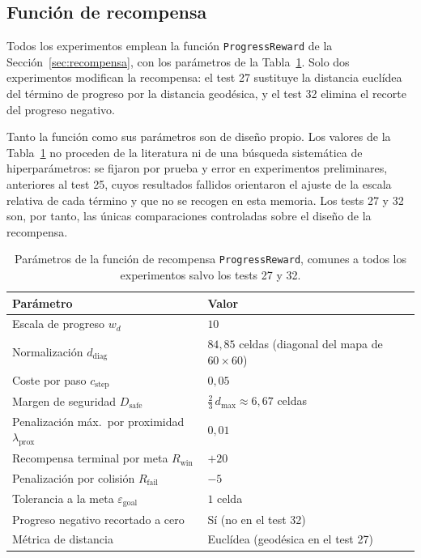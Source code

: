 \subsection{Función de recompensa}
Todos los experimentos emplean la función \texttt{ProgressReward} de la
Sección~\ref{sec:recompensa}, con los parámetros de la
Tabla~\ref{tab:recompensa_params}. Solo dos experimentos modifican la
recompensa: el test 27 sustituye la distancia euclídea del término de
progreso por la distancia geodésica, y el test 32 elimina el recorte del
progreso negativo.

Tanto la función como sus parámetros son de diseño propio. Los valores de
la Tabla~\ref{tab:recompensa_params} no proceden de la literatura ni de
una búsqueda sistemática de hiperparámetros: se fijaron por prueba y error
en experimentos preliminares, anteriores al test 25, cuyos resultados
fallidos orientaron el ajuste de la escala relativa de cada término y que
no se recogen en esta memoria. Los tests 27 y 32 son, por tanto, las
únicas comparaciones controladas sobre el diseño de la recompensa.

\begin{table}[htbp]
    \centering
    \caption[Parámetros de la función de recompensa]{Parámetros de la
    función de recompensa \texttt{ProgressReward}, comunes a todos los
    experimentos salvo los tests 27 y 32.}
    \label{tab:recompensa_params}
    \begin{tabular}{ll}
        \toprule
        \textbf{Parámetro} & \textbf{Valor} \\
        \midrule
        Escala de progreso $w_d$ & $10$ \\
        Normalización $d_{\text{diag}}$ & $84{,}85$ celdas (diagonal del mapa de $60 \times 60$) \\
        Coste por paso $c_{\text{step}}$ & $0{,}05$ \\
        Margen de seguridad $D_{\text{safe}}$ & $\tfrac{2}{3}\,d_{\max} \approx 6{,}67$ celdas \\
        Penalización máx.\ por proximidad $\lambda_{\text{prox}}$ & $0{,}01$ \\
        Recompensa terminal por meta $R_{\text{win}}$ & $+20$ \\
        Penalización por colisión $R_{\text{fail}}$ & $-5$ \\
        Tolerancia a la meta $\varepsilon_{\text{goal}}$ & $1$ celda \\
        Progreso negativo recortado a cero & Sí (no en el test 32) \\
        Métrica de distancia & Euclídea (geodésica en el test 27) \\
        \bottomrule
    \end{tabular}
\end{table}

